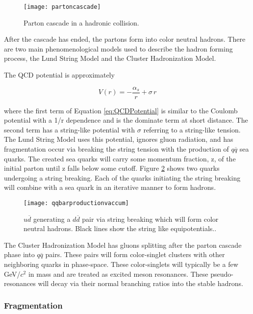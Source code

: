 \begin{figure}[h]
\texttt{[image: partoncascade]}
\centering
\caption{Parton cascade in a hadronic collision\cite{Webber:1994zd}.}
\label{fig:pcascade}
\end{figure}

\noindent
After the cascade has ended, the partons form into color neutral hadrons.  There are two main phenomenological models used to describe the hadron forming process, the Lund String Model and the Cluster Hadronization Model.  

The QCD potential is approximately

\begin{equation}
V(r) = - \frac{\alpha_{s}}{r} + \sigma \, r
\label{eq:QCDPotential}
\end{equation}

\noindent
where the first term of Equation \ref{eq:QCDPotential} is similar to the Coulomb potential with a 1/r dependence and is the dominate term at short distance.  The second term has a string-like potential with $\sigma$ referring to a string-like tension.  The Lund String Model uses this potential, ignores gluon radiation, and has fragmentation occur via breaking the string tension with the production of $q\overline{q}$ sea quarks.  The created sea quarks will carry some momentum fraction, z, of the initial parton until z falls below some cutoff.  Figure \ref{fig:qqbarstring} shows two quarks undergoing a string breaking.  Each of the quarks initiating the string breaking will combine with a sea quark in an iterative manner to form hadrons.  


\begin{figure}[b!]
\texttt{[image: qqbarproductionvaccum]}
\centering
\caption{$u \overline{d}$ generating a $d \overline{d}$ pair via string breaking which will form color neutral hadrons.  Black lines show the string like equipotentials.\cite{Andersson:2002ap}.}
\label{fig:qqbarstring}
\end{figure}

The Cluster Hadronization Model has gluons splitting after the parton cascade phase into $q\overline{q}$ pairs.  These pairs will form color-singlet clusters with other neighboring quarks in phase-space.  These color-singlets will typically be a few GeV/\textit{$c^{2}$} in mass and are treated as excited meson resonances.  These pseudo-resonances will decay via their normal branching ratios into the stable hadrons\cite{Webber:1983if}.

\subsubsection{Fragmentation}

